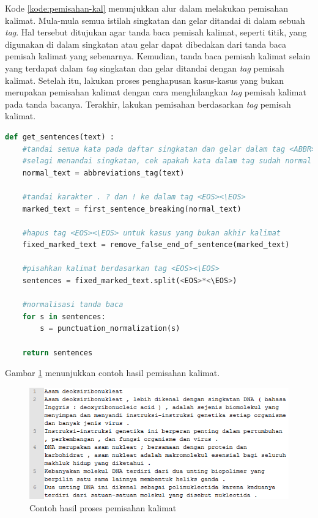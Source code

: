 Kode \ref{kode:pemisahan-kal} menunjukkan alur dalam melakukan pemisahan kalimat. Mula-mula semua istilah singkatan dan gelar ditandai di dalam sebuah \textit{tag}. Hal tersebut ditujukan agar tanda baca pemisah kalimat, seperti titik, yang digunakan di dalam singkatan atau gelar dapat dibedakan dari tanda baca pemisah kalimat yang sebenarnya. Kemudian, tanda baca pemisah kalimat selain yang terdapat dalam \textit{tag} singkatan dan gelar ditandai dengan \textit{tag} pemisah kalimat. Setelah itu, lakukan proses penghapusan kasus-kasus yang bukan merupakan pemisahan kalimat dengan cara menghilangkan \textit{tag} pemisah kalimat pada tanda bacanya. Terakhir, lakukan pemisahan berdasarkan \textit{tag} pemisah kalimat.
\begin{lstlisting}[language=Python, caption={Pemisahan kalimat}, label={kode:pemisahan-kal}]
def get_sentences(text) :
	#tandai semua kata pada daftar singkatan dan gelar dalam tag <ABBR><\ABBR>
	#selagi menandai singkatan, cek apakah kata dalam tag sudah normal
	normal_text = abbreviations_tag(text)
	
	#tandai karakter . ? dan ! ke dalam tag <EOS><\EOS>
	marked_text = first_sentence_breaking(normal_text)
	
	#hapus tag <EOS><\EOS> untuk kasus yang bukan akhir kalimat
	fixed_marked_text = remove_false_end_of_sentence(marked_text)
	
	#pisahkan kalimat berdasarkan tag <EOS><\EOS>
	sentences = fixed_marked_text.split(<EOS>*<\EOS>)
	
	#normalisasi tanda baca
	for s in sentences:
		s = punctuation_normalization(s)
		
	return sentences
\end{lstlisting}
Gambar \ref{fig:sen-split} menunjukkan contoh hasil pemisahan kalimat.
\begin{figure}
	\centering
	\includegraphics[width=1\linewidth]{pics/sen-split}
	\caption{Contoh hasil proses pemisahan kalimat}
	\label{fig:sen-split}
\end{figure}

